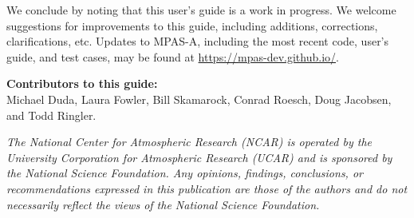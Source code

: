 We conclude by noting that this user's guide is a work in progress.  We welcome suggestions for improvements to this guide, including additions, corrections, clarifications, etc.  Updates to MPAS-A, including the most recent code,
user's guide, and test cases, may be found at \hfil\break \url{https://mpas-dev.github.io/}.

\vspace{8pt}
\noindent
{\bf Contributors to this guide:}\\
Michael Duda, Laura Fowler, Bill Skamarock, Conrad Roesch, Doug Jacobsen, and Todd Ringler.


\vfil
\noindent
{\it The National Center for Atmospheric Research (NCAR) is operated by the
University Corporation for Atmospheric Research (UCAR) and is sponsored by the
National Science Foundation.  Any opinions, findings, conclusions, or
recommendations expressed in this publication are those of the authors and do
not necessarily reflect the views of the National Science Foundation.}
